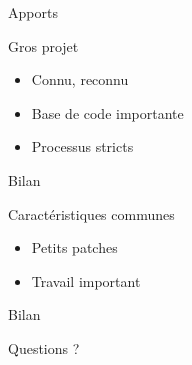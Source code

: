 \documentclass[handout]{beamer}
\begin{document}
\begin{frame}{Apports}
    \begin{block}{Gros projet}
        \begin{itemize}[<+->]
            \item Connu, reconnu
            \item Base de code importante
            \item Processus stricts
        \end{itemize}
    \end{block}
\end{frame}

\begin{frame}{Bilan}
    \begin{block}{Caractéristiques communes}
        \begin{itemize}[<+->]
            \item Petits patches
            \item Travail important
        \end{itemize}
    \end{block}
\end{frame}

\begin{frame}{Bilan}
    \begin{block}{}
        \begin{center}
            Questions ?
        \end{center}
    \end{block}
\end{frame}
\end{document}
